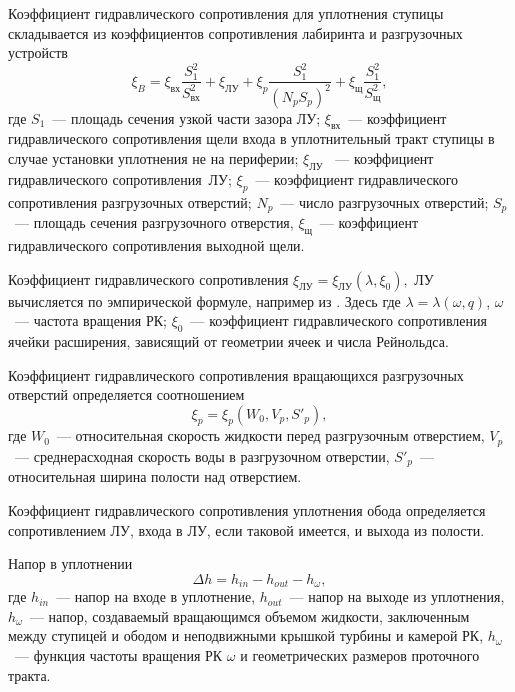 Коэффициент гидравлического сопротивления для уплотнения ступицы складывается из коэффициентов сопротивления 
лабиринта и разгрузочных устройств
\begin{equation*}
  \xi _B = \xi _{\text{вх}} \frac{{S_1^2}}{{S_{\text{вх}}^2}} + 
  \xi _{\text{ЛУ}} + \xi_p \frac{{S_1^2 }}{{\left( {N_p S_p } \right)^2 }}+
  \xi_{\text{щ}}\frac{{S_1^2}}{{S_{\text{щ}}^2 }},
\end{equation*}
где $S_1$~--- площадь сечения узкой части зазора ЛУ; $\xi_{\text{вх}}$~--- коэффициент гидравлического 
сопротивления щели входа в уплотнительный тракт ступицы в случае установки уплотнения не на 
периферии; $\xi_{\text{ЛУ}}$ ~--- коэффициент гидравлического сопротивления~ЛУ;
 $\xi_p$~--- коэффициент гидравлического сопротивления разгрузочных 
 отверстий; $N_p$~--- число разгрузочных отверстий; $S_p$~--- площадь сечения разгрузочного 
 отверстия, $\xi_{\text{щ}}$~--- коэффициент гидравлического сопротивления выходной щели.

Коэффициент гидравлического сопротивления $\xi_{\text{ЛУ}} = \xi_{\text{ЛУ}}(\lambda ,\xi_0),$ ЛУ вычисляется 
по эмпирической формуле, например из \cite{idelchik}. Здесь
где $\lambda = \lambda (\omega ,q)$, $\omega$~--- частота вращения РК; $\xi_0$~--- коэффициент 
гидравлического сопротивления ячейки расширения, зависящий от геометрии ячеек и числа Рейнольдса.

Коэффициент гидравлического сопротивления вращающихся разгрузочных отверстий определяется соотношением
\begin{equation*}
  \xi_p = \xi _p (W_0 ,V_p ,S'_p ),
\end{equation*}
где $W_0$~--- относительная скорость жидкости перед разгрузочным отверстием, $V_p$~--- среднерасходная 
скорость воды в разгрузочном отверстии, $S'_p$~--- относительная ширина полости над отверстием.

Коэффициент гидравлического сопротивления уплотнения обода определяется сопротивлением ЛУ, 
входа в ЛУ, если таковой имеется, и выхода из полости.

Напор  в уплотнении
\begin{equation*}
  \Delta h = h_{in} - h_{out} - h_\omega,
\end{equation*}
где $h_{in}$~--- напор на входе в уплотнение, $h_{out}$~--- напор на выходе из 
уплотнения, $h_\omega$~--- напор, создаваемый вращающимся объемом жидкости,
заключенным между ступицей и ободом и неподвижными крышкой турбины и камерой 
РК, $h_\omega$~--- функция  частоты вращения РК $\omega$ и геометрических размеров проточного тракта.

